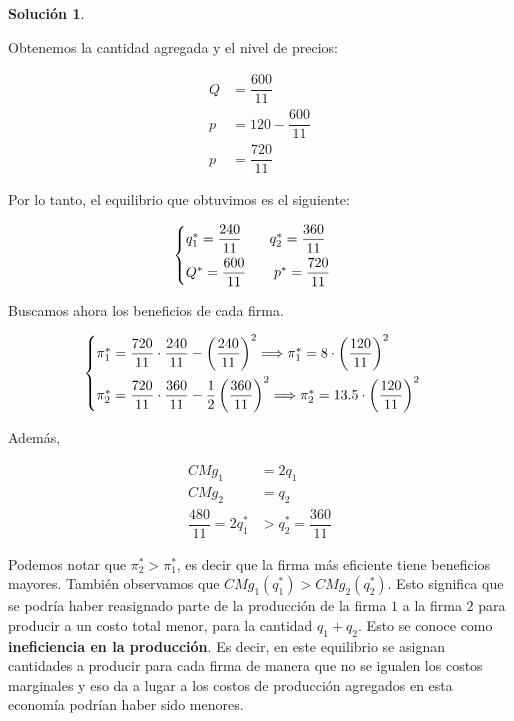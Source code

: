\documentclass[a4paper, 11pt]{article}
\theoremstyle{definition}
\newtheorem{solucion}{Soluci\'on}
\begin{document}
\begin{solucion}
\begin{enumerate}[label=(\alph*)]
Obtenemos la cantidad agregada y el nivel de precios:

\vspace*{-16pt}

\begin{align*}
Q&=\dfrac{600}{11}\\
p&=120-\dfrac{600}{11}\\
p&=\dfrac{720}{11}
\end{align*}

\vspace*{-8pt}

Por lo tanto, el equilibrio que obtuvimos es el siguiente:

\vspace*{-16pt}

\begin{align*}
\begin{cases} q_1^*=\dfrac{240}{11} \qquad q_2^*=\dfrac{360}{11} \vspace{4pt}\\  Q^*=\dfrac{600}{11} \qquad
p^*=\dfrac{720}{11} \end{cases}
\end{align*}

Buscamos ahora los beneficios de cada firma.

\vspace*{-12pt}

\begin{align*}\begin{cases}
\pi_1^*=\dfrac{720}{11}\cdot\dfrac{240}{11}-\left(\dfrac{240}{11}\right)^2\Longrightarrow
\pi_1^*=8\cdot\left(\dfrac{120}{11}\right)^2\vspace{4pt}\\
\pi_2^*=\dfrac{720}{11}\cdot\dfrac{360}{11}-\dfrac{1}{2}\left(\dfrac{360}{11}\right)^2\Longrightarrow
\pi_2^*=13.5\cdot\left(\dfrac{120}{11}\right)^2
\end{cases}
\end{align*}

Además,

\vspace{-24pt}

\begin{align*}
CMg_1&=2q_1\\
CMg_2&=q_2\\
\dfrac{480}{11}=2q_1^*&>q_2^*=\dfrac{360}{11}
\end{align*}

Podemos notar que $\pi_2^*>\pi_1^*$, es decir que la firma más eficiente tiene beneficios mayores. También observamos que $CMg_1(q_1^*)>CMg_2(q_2^*)$. Esto significa que se podría haber reasignado parte de la producción de la firma $1$ a la firma $2$ para producir a un costo total menor, para la cantidad $q_1+q_2$. Esto se conoce como \textbf{ineficiencia en la producción}. Es decir, en este equilibrio se asignan cantidades a producir para cada firma de manera que no se igualen los costos marginales y eso da a lugar a los costos de producción agregados en esta economía podrían haber sido menores.


\end{enumerate}
\end{solucion}
\end{document}
